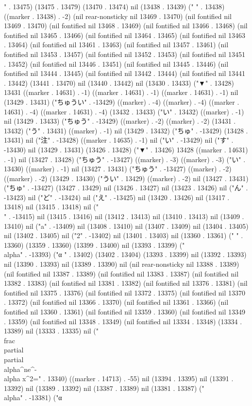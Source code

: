 {" . 13475) (13475 . 13479) (13470 . 13474) nil (13438 . 13439) ("  " . 13438) ((marker . 13438) . -2) (nil rear-nonsticky nil 13469 . 13470) (nil fontified nil 13469 . 13470) (nil fontified nil 13468 . 13469) (nil fontified nil 13466 . 13468) (nil fontified nil 13465 . 13466) (nil fontified nil 13464 . 13465) (nil fontified nil 13463 . 13464) (nil fontified nil 13461 . 13463) (nil fontified nil 13457 . 13461) (nil fontified nil 13453 . 13457) (nil fontified nil 13452 . 13453) (nil fontified nil 13451 . 13452) (nil fontified nil 13446 . 13451) (nil fontified nil 13445 . 13446) (nil fontified nil 13444 . 13445) (nil fontified nil 13442 . 13444) (nil fontified nil 13441 . 13442) (13441 . 13470) nil (13440 . 13442) nil (13430 . 13433) ("▼" . 13428) 13431 ((marker . 14631) . -1) ((marker . 14631) . -1) ((marker . 14631) . -1) nil (13429 . 13431) ("ちゅうい" . -13429) ((marker) . -4) ((marker) . -4) ((marker . 14631) . -4) ((marker . 14631) . -4) (13432 . 13433) ("い" . 13432) ((marker) . -1) nil (13429 . 13433) ("ちゅう" . -13429) ((marker) . -2) ((marker) . -2) (13431 . 13432) ("う" . 13431) ((marker) . -1) nil (13429 . 13432) ("ちゅ" . -13429) (13428 . 13431) nil ("注" . -13428) ((marker . 14635) . -1) nil ("い" . -13429) nil ("す" . -13430) nil (13429 . 13431) (13426 . 13428) ("▼" . 13426) 13428 ((marker . 14631) . -1) nil (13427 . 13428) ("ちゅう" . -13427) ((marker) . -3) ((marker) . -3) ("い" . 13430) ((marker) . -1) nil (13427 . 13431) ("ちゅう" . -13427) ((marker) . -2) ((marker) . -2) (13429 . 13430) ("うい" . 13429) ((marker) . -2) nil (13427 . 13431) ("ちゅ" . -13427) (13427 . 13429) nil (13426 . 13427) nil (13423 . 13426) nil ("ん" . -13423) nil ("ど" . -13424) nil ("え" . -13425) nil (13420 . 13426) nil (13417 . 13418) nil (13415 . 13418) nil ("\\" . -13415) nil (13415 . 13416) nil (13412 . 13413) nil (13410 . 13413) nil (13409 . 13410) nil ("a" . -13409) nil (13408 . 13410) nil (13407 . 13409) nil (13404 . 13405) nil (13402 . 13405) nil ("2" . -13402) nil (13401 . 13403) nil (13360 . 13361) (" " . 13360) (13359 . 13360) (13399 . 13400) nil (13393 . 13399) ("\\alpha" . -13393) ("α
" . 13402) (13402 . 13404) (13393 . 13399) nil (13392 . 13393) nil (13390 . 13393) nil (13389 . 13390) nil (nil rear-nonsticky nil 13388 . 13389) (nil fontified nil 13387 . 13389) (nil fontified nil 13383 . 13387) (nil fontified nil 13382 . 13383) (nil fontified nil 13381 . 13382) (nil fontified nil 13376 . 13381) (nil fontified nil 13375 . 13376) (nil fontified nil 13372 . 13375) (nil fontified nil 13370 . 13372) (nil fontified nil 13366 . 13370) (nil fontified nil 13361 . 13366) (nil fontified nil 13360 . 13361) (nil fontified nil 13359 . 13360) (nil fontified nil 13349 . 13359) (nil fontified nil 13348 . 13349) (nil fontified nil 13334 . 13348) (13334 . 13389) nil (13333 . 13335) nil ("\\frac{\\partial }{\\partial \\alpha^{n}}e^{-\\alpha x^{2}}=" . 13340) ((marker . 14713) . -55) nil (13394 . 13395) nil (13391 . 13392) nil (13389 . 13392) nil (13387 . 13389) nil (13381 . 13387) ("\\alpha" . -13381) ("α
}
